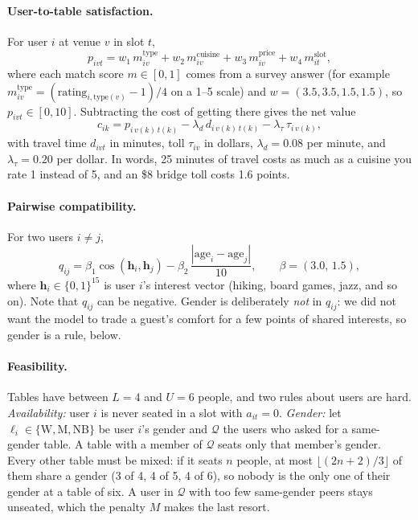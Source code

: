 \documentclass[10pt]{article}
\newcommand{\Q}{\mathcal{Q}}
\begin{document}
\paragraph{User-to-table satisfaction.} For user $i$ at venue $v$ in slot $t$,
\begin{equation}
p_{ivt} = w_1\,m^{\text{type}}_{iv} + w_2\,m^{\text{cuisine}}_{iv} + w_3\,m^{\text{price}}_{iv} + w_4\,m^{\text{slot}}_{it},
\end{equation}
where each match score $m\in[0,1]$ comes from a survey answer (for example $m^{\text{type}}_{iv}=(\text{rating}_{i,\text{type}(v)}-1)/4$ on a 1--5 scale) and $w=(3.5,3.5,1.5,1.5)$, so $p_{ivt}\in[0,10]$. Subtracting the cost of getting there gives the net value
\begin{equation}
c_{ik} = p_{i\,v(k)\,t(k)} - \lambda_d\, d_{i\,v(k)\,t(k)} - \lambda_\tau\, \tau_{i\,v(k)},
\end{equation}
with travel time $d_{ivt}$ in minutes, toll $\tau_{iv}$ in dollars, $\lambda_d=0.08$ per minute, and $\lambda_\tau=0.20$ per dollar. In words, 25 minutes of travel costs as much as a cuisine you rate 1 instead of 5, and an \$8 bridge toll costs 1.6 points.

\paragraph{Pairwise compatibility.} For two users $i\neq j$,
\begin{equation}
q_{ij} = \beta_1\cos(\mathbf{h}_i,\mathbf{h}_j) - \beta_2\,\frac{|\text{age}_i-\text{age}_j|}{10},
\qquad \beta=(3.0,\,1.5),
\end{equation}
where $\mathbf{h}_i\in\{0,1\}^{15}$ is user $i$'s interest vector (hiking, board games, jazz, and so on). Note that $q_{ij}$ can be negative. Gender is deliberately \emph{not} in $q_{ij}$: we did not want the model to trade a guest's comfort for a few points of shared interests, so gender is a rule, below.

\paragraph{Feasibility.} Tables have between $L=4$ and $U=6$ people, and two rules about users are hard. \emph{Availability:} user $i$ is never seated in a slot with $a_{it}=0$. \emph{Gender:} let $\ell_i\in\{\text{W},\text{M},\text{NB}\}$ be user $i$'s gender and $\Q$ the users who asked for a same-gender table. A table with a member of $\Q$ seats only that member's gender. Every other table must be mixed: if it seats $n$ people, at most $\lfloor(2n+2)/3\rfloor$ of them share a gender (3 of 4, 4 of 5, 4 of 6), so nobody is the only one of their gender at a table of six. A user in $\Q$ with too few same-gender peers stays unseated, which the penalty $M$ makes the last resort.
\end{document}
